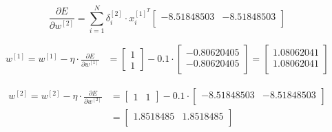 \documentclass[12pt]{article}
\begin{document}
\begin{enumerate}[leftmargin=\labelsep]
        \begin{equation*}
          \frac{\partial E}{\partial w^{[2]}}
          = \sum_{i=1}^N \delta_i^{[2]}
          \cdot x_i^{[1]^T}
          \begin{bmatrix}
            -8.51848503 & -8.51848503 \\
          \end{bmatrix}
        \end{equation*}

        \begin{equation*}
          \begin{aligned}
            w^{[1]} = w^{[1]} - \eta \cdot \frac{\partial E}{\partial w^{[1]}}
             & = \begin{bmatrix}
                   1 \\
                   1
                 \end{bmatrix} - 0.1 \cdot \begin{bmatrix}
                                             -0.80620405 \\
                                             -0.80620405 \\
                                           \end{bmatrix} = \begin{bmatrix}
                                                             1.08062041 \\
                                                             1.08062041 \\
                                                           \end{bmatrix}
          \end{aligned}
        \end{equation*}

        \begin{equation*}
          \begin{aligned}
            w^{[2]} = w^{[2]} - \eta \cdot \frac{\partial E}{\partial w^{[2]}}
             & = \begin{bmatrix}
                   1 & 1
                 \end{bmatrix} - 0.1 \cdot
            \begin{bmatrix}
              -8.51848503 & -8.51848503 \\
            \end{bmatrix}      \\
             & = \begin{bmatrix}
                   1.8518485 & 1.8518485 \\
                 \end{bmatrix}
          \end{aligned}
        \end{equation*}


\end{enumerate}
\end{document}
